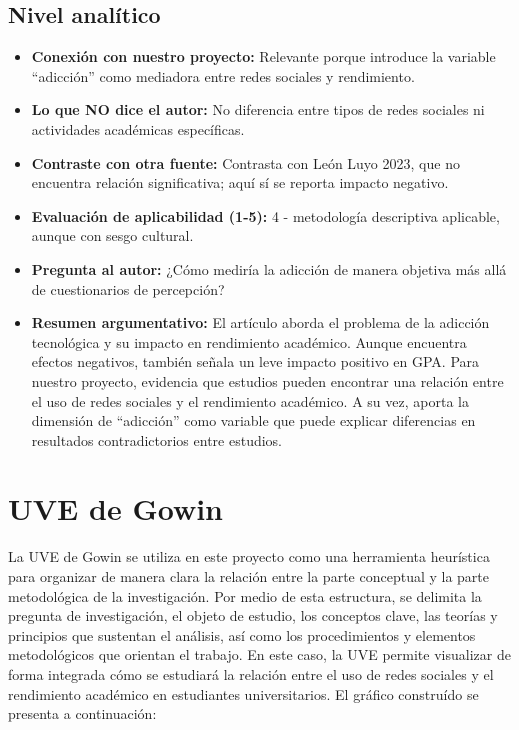 \documentclass[12pt]{article}
\begin{document}
\subsection*{Nivel analítico}
\begin{itemize}
  \item \textbf{Conexión con nuestro proyecto:} Relevante porque introduce la variable “adicción” como mediadora entre redes sociales y rendimiento.
  \item \textbf{Lo que NO dice el autor:} No diferencia entre tipos de redes sociales ni actividades académicas específicas.
  \item \textbf{Contraste con otra fuente:} Contrasta con León Luyo 2023, que no encuentra relación significativa; aquí sí se reporta impacto negativo.
  \item \textbf{Evaluación de aplicabilidad (1-5):} 4 - metodología descriptiva aplicable, aunque con sesgo cultural.
  \item \textbf{Pregunta al autor:} ¿Cómo mediría la adicción de manera objetiva más allá de cuestionarios de percepción?
  \item \textbf{Resumen argumentativo:} El artículo aborda el problema de la adicción tecnológica y su impacto en rendimiento académico. Aunque encuentra efectos negativos, también señala un leve impacto positivo en GPA. Para nuestro proyecto, evidencia que estudios pueden encontrar una relación entre el uso de redes sociales y el rendimiento académico. A su vez, aporta la dimensión de “adicción” como variable que puede explicar diferencias en resultados contradictorios entre estudios.
\end{itemize}

\section{UVE de Gowin}

La UVE de Gowin se utiliza en este proyecto como una herramienta heurística para organizar de manera clara la relación entre la parte conceptual y la parte metodológica de la investigación. Por medio de esta estructura, se delimita la pregunta de investigación, el objeto de estudio, los conceptos clave, las teorías y principios que sustentan el análisis, así como los procedimientos y elementos metodológicos que orientan el trabajo. En este caso, la UVE permite visualizar de forma integrada cómo se estudiará la relación entre el uso de redes sociales y el rendimiento académico en estudiantes universitarios. El gráfico construído se presenta a continuación:
\end{document}
